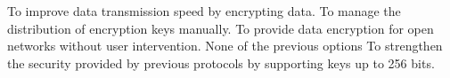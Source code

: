 \begin{checkboxes}
    \choice To improve data transmission speed by encrypting data.
    \choice To manage the distribution of encryption keys manually.
    \CorrectChoice To provide data encryption for open networks without user intervention.
    \choice None of the previous options
    \choice To strengthen the security provided by previous protocols by supporting keys up to 256 bits.
\end{checkboxes}